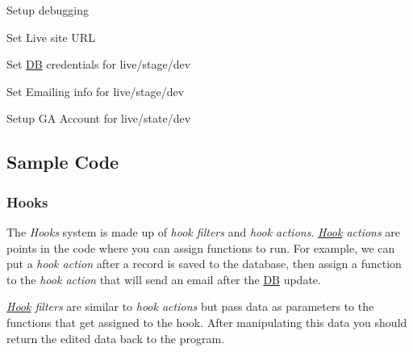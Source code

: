 \begin{DoxyItemize}
\item Setup debugging
\item Set Live site U\-R\-L
\item Set \hyperlink{class_d_b}{D\-B} credentials for live/stage/dev
\item Set Emailing info for live/stage/dev
\item Setup G\-A Account for live/state/dev
\end{DoxyItemize}

\subsection*{Sample Code}

\subsubsection*{Hooks}

The {\itshape Hooks} system is made up of {\itshape hook filters} and {\itshape hook actions}. {\itshape \hyperlink{class_hook}{Hook} actions} are points in the code where you can assign functions to run. For example, we can put a {\itshape hook action} after a record is saved to the database, then assign a function to the {\itshape hook action} that will send an email after the \hyperlink{class_d_b}{D\-B} update. 


{\itshape \hyperlink{class_hook}{Hook} filters} are similar to {\itshape hook actions} but pass data as parameters to the functions that get assigned to the hook. After manipulating this data you should return the edited data back to the program. 


